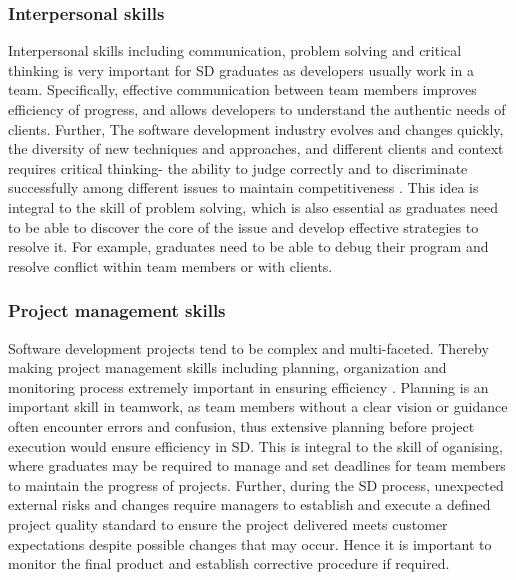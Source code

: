 \documentclass[a4paper, 11pt]{report}
\begin{document}
\subsubsection{Interpersonal skills}
Interpersonal skills including communication, problem solving and critical thinking is very important for SD graduates as developers usually work in a team. Specifically, effective communication between team members improves efficiency of progress, and allows developers to understand the authentic needs of clients. Further, The software development industry evolves and changes quickly, the diversity of new techniques and approaches, and different clients and context requires critical thinking- the ability to judge correctly and to discriminate successfully among different issues to maintain competitiveness \cite{chouseinoglou2014introducing}. This idea is integral to the skill of problem solving, which is also essential as graduates need to be able to discover the core of the issue and develop effective strategies to resolve it. For example, graduates need to be able to debug their program and resolve conflict within team members or with clients. 

\subsubsection{Project management skills}
Software development projects tend to be complex and multi-faceted. Thereby making project management skills including planning, organization and monitoring process extremely important in ensuring efficiency \cite{Orasesnd}. Planning is an important skill in teamwork, as team members without a clear vision or guidance often encounter errors and confusion, thus extensive planning before project execution would ensure efficiency in SD. This is integral to the skill of oganising, where graduates may be required to manage and set deadlines for team members to maintain the progress of projects. Further, during the SD process, unexpected external risks and changes require managers to establish and execute a defined project quality standard to ensure the project delivered meets customer expectations despite possible changes that may occur. Hence it is important to monitor the final product and establish corrective procedure if required.
 
\end{document}
